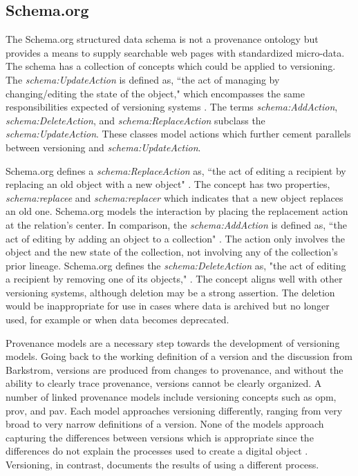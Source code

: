 \subsection{Schema.org}

\sloppy
The Schema.org structured data schema is not a provenance ontology but provides a means to supply searchable web pages with standardized micro-data.
The schema has a collection of concepts which could be applied to versioning.
The \textit{schema:UpdateAction} is defined as, ``the act of managing by changing/editing the state of the object," which encompasses the same responsibilities expected of versioning systems \cite{Schema}.
The terms \textit{schema:AddAction}, \textit{schema:DeleteAction}, and \textit{schema:ReplaceAction} subclass the \textit{schema:UpdateAction}.
These classes model actions which further cement parallels between versioning and \textit{schema:UpdateAction}.

\fussy
Schema.org defines a \textit{schema:ReplaceAction} as, ``the act of editing a recipient by replacing an old object with a new object" \cite{SchemaRep}.
The concept has two properties, \textit{schema:replacee} and \textit{schema:replacer} which indicates that a new object replaces an old one.
Schema.org models the interaction by placing the replacement action at the relation's center.
In comparison, the \textit{schema:AddAction} is defined as, ``the act of editing by adding an object to a collection" \cite{SchemaAdd}.
The action only involves the object and the new state of the collection, not involving any of the collection's prior lineage.
Schema.org defines the \textit{schema:DeleteAction} as, "the act of editing a recipient by removing one of its objects," \cite{SchemaRem}.
The concept aligns well with other versioning systems, although deletion may be a strong assertion.
The deletion would be inappropriate for use in cases where data is archived but no longer used, for example or when data becomes deprecated.

Provenance models are a necessary step towards the development of versioning models.
Going back to the working definition of a version and the discussion from Barkstrom, \glspl{version} are produced from changes to \gls{provenance}, and without the ability to clearly trace \gls{provenance}, \glspl{version} cannot be clearly organized.
A number of \gls{linked} \gls{provenance} models include versioning concepts such as \gls{opm}, \gls{prov}, and \gls{pav}.
Each model approaches versioning differently, ranging from very broad to very narrow definitions of a \gls{version}.
None of the models approach capturing the differences between \glspl{version} which is appropriate since the differences do not explain the processes used to create a digital object \cite{moreau2008open}.
Versioning, in contrast, documents the results of using a different process.

